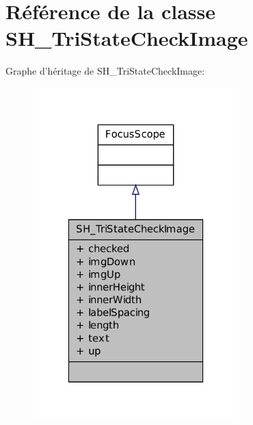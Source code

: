 \hypertarget{classSH__TriStateCheckImage}{\section{Référence de la classe S\-H\-\_\-\-Tri\-State\-Check\-Image}
\label{classSH__TriStateCheckImage}
}


Graphe d'héritage de S\-H\-\_\-\-Tri\-State\-Check\-Image\-:
\nopagebreak
\begin{figure}[H]
\begin{center}
\leavevmode
\includegraphics[width=226pt]{classSH__TriStateCheckImage__inherit__graph}
\end{center}
\end{figure}


